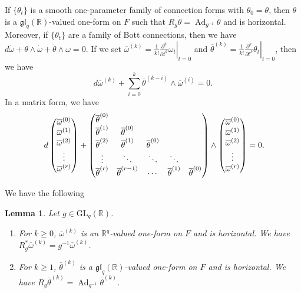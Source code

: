 \documentclass[12pt]{amsart}
\newcommand{\R}{{\mathbb R}}
\newcommand{\gl}{\mathfrak{gl}}
\newcommand{\GL}{\mathrm{GL}}
\DeclareMathOperator{\Ad}{\mathrm{Ad}}
\newtheorem{lemma}[theorem]{Lemma}
\theoremstyle{definition}
\theoremstyle{remark}
\begin{document}
If $\{\theta_t\}$ is a smooth one-parameter family of connection forms with $\theta_0=\theta$, then $\dot\theta$ is a $\gl_q(\R)$-valued one-form on $F$ such that $R_g\dot\theta=\Ad_{g^{-1}}\dot\theta$ and is horizontal.
Moreover, if $\{\theta_t\}$ are a family of Bott connections, then we have $d\dot{\omega}+\theta\wedge\dot{\omega}+\dot\theta\wedge\omega=0$.
If we set $\overline{\omega}^{(k)}=\frac1{k!}\left.\frac{\partial^k}{\partial t^k}\omega_t\right|_{t=0}$ and $\overline{\theta}^{(k)}=\frac1{k!}\left.\frac{\partial^k}{\partial t^k}\theta_t\right|_{t=0}$, then we have
\[
d\overline{\omega}^{(k)}+\sum_{i=0}^k\overline{\theta}^{(k-i)}\wedge\overline{\omega}^{(i)}=0.
\tag{\thetheorem}
\label{eq6.0}
\]
In a matrix form, we have
\[
d\begin{pmatrix}
\overline{\omega}^{(0)}\\
\overline{\omega}^{(1)}\\
\overline{\omega}^{(2)}\\
\vdots\\
\overline{\omega}^{(r)}
\end{pmatrix}+\begin{pmatrix}
\overline{\theta}^{(0)}\\
\overline{\theta}^{(1)} & \overline{\theta}^{(0)}\\
\overline{\theta}^{(2)} & \overline{\theta}^{(1)} & \overline{\theta}^{(0)}\\
\vdots & \ddots & \ddots & \ddots\\
\overline{\theta}^{(r)} & \overline{\theta}^{(r-1)} & \cdots & \overline{\theta}^{(1)} & \overline{\theta}^{(0)}
\end{pmatrix}\wedge\begin{pmatrix}
\overline{\omega}^{(0)}\\
\overline{\omega}^{(1)}\\
\overline{\omega}^{(2)}\\
\vdots\\
\overline{\omega}^{(r)}
\end{pmatrix}=0\rlap{.}
\]

We have the following

\begin{lemma}
Let $g\in\GL_q(\R)$.
\begin{enumerate}[label=\textup{\arabic*)}]
\item
For $k\geq0$, $\overline{\omega}^{(k)}$ is an $\R^q$-valued one-form on $F$ and is horizontal.
We have $R_g^*\overline{\omega}^{(k)}=g^{-1}\overline{\omega}^{(k)}$.
\item
For $k\geq1$, $\overline{\theta}^{(k)}$ is a $\gl_q(\R)$-valued one-form on $F$ and is horizontal.
We have $R_g\overline{\theta}^{(k)}=\Ad_{g^{-1}}\overline{\theta}^{(k)}$.
\end{enumerate}
\end{lemma}
\end{document}
